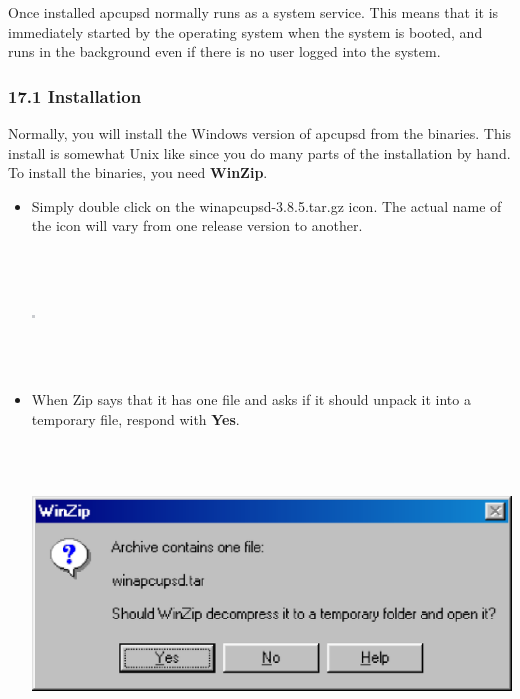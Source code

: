 {{{{{{{{{{Once installed apcupsd normally runs as a system service.  This means that it
is immediately started by the operating system when the system is booted, and
runs in the background even if there is no user logged into the system. 

\label{Installation}

\subsubsection*{17.1 Installation}

Normally, you will install the Windows version of apcupsd from the binaries.
This install is somewhat Unix like since you do many parts of the installation
by hand. To install the binaries, you need {\bf WinZip}.  

\begin{itemize}
\item Simply double click on the winapcupsd-3.8.5.tar.gz icon.  The actual
name of the icon will vary from one release version to another.  

\footnotesize
\begin{verbatim}
     
     
\end{verbatim}
\normalsize

\includegraphics{./wininstall3.eps}  

\footnotesize
\begin{verbatim}
     
     
\end{verbatim}
\normalsize

\item When Zip says that it has one file and asks if it should unpack it into
a temporary file, respond with {\bf Yes}.  

\footnotesize
\begin{verbatim}
     
     
\end{verbatim}
\normalsize

\includegraphics{./wininstall4.eps}  


\end{itemize}}}}}}}}}}}
